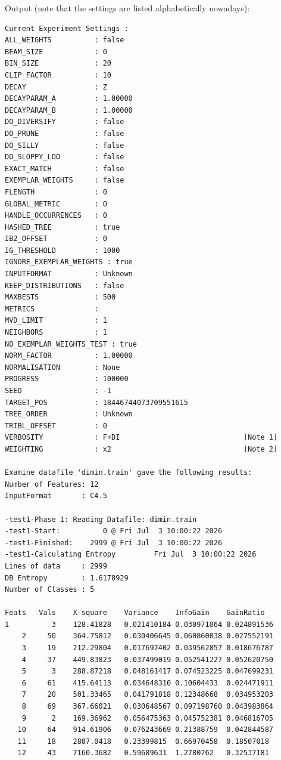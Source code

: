 \documentclass{report}
\begin{document}
Output (note that the settings are listed alphabetically nowadays):
\begin{footnotesize}
\begin{verbatim}
Current Experiment Settings :
ALL_WEIGHTS          : false
BEAM_SIZE            : 0
BIN_SIZE             : 20
CLIP_FACTOR          : 10
DECAY                : Z
DECAYPARAM_A         : 1.00000
DECAYPARAM_B         : 1.00000
DO_DIVERSIFY         : false
DO_PRUNE             : false
DO_SILLY             : false
DO_SLOPPY_LOO        : false
EXACT_MATCH          : false
EXEMPLAR_WEIGHTS     : false
FLENGTH              : 0
GLOBAL_METRIC        : O
HANDLE_OCCURRENCES   : 0
HASHED_TREE          : true
IB2_OFFSET           : 0
IG_THRESHOLD         : 1000
IGNORE_EXEMPLAR_WEIGHTS : true
INPUTFORMAT          : Unknown
KEEP_DISTRIBUTIONS   : false
MAXBESTS             : 500
METRICS              :
MVD_LIMIT            : 1
NEIGHBORS            : 1
NO_EXEMPLAR_WEIGHTS_TEST : true
NORM_FACTOR          : 1.00000
NORMALISATION        : None
PROGRESS             : 100000
SEED                 : -1
TARGET_POS           : 18446744073709551615
TREE_ORDER           : Unknown
TRIBL_OFFSET         : 0
VERBOSITY            : F+DI                             [Note 1]
WEIGHTING            : x2                               [Note 2]

Examine datafile 'dimin.train' gave the following results:
Number of Features: 12
InputFormat       : C4.5

-test1-Phase 1: Reading Datafile: dimin.train
-test1-Start:          0 @ Fri Jul  3 10:00:22 2026
-test1-Finished:    2999 @ Fri Jul  3 10:00:22 2026
-test1-Calculating Entropy         Fri Jul  3 10:00:22 2026
Lines of data     : 2999
DB Entropy        : 1.6178929
Number of Classes : 5

Feats	Vals	X-square	Variance	InfoGain	GainRatio
1          3	128.41828	0.021410184	0.030971064	0.024891536
    2     50	364.75812	0.030406645	0.060860038	0.027552191
    3     19	212.29804	0.017697402	0.039562857	0.018676787
    4     37	449.83823	0.037499019	0.052541227	0.052620750
    5      3	288.87218	0.048161417	0.074523225	0.047699231
    6     61	415.64113	0.034648310	0.10604433	0.024471911
    7     20	501.33465	0.041791818	0.12348668	0.034953203
    8     69	367.66021	0.030648567	0.097198760	0.043983864
    9      2	169.36962	0.056475363	0.045752381	0.046816705
   10     64	914.61906	0.076243669	0.21388759	0.042844587
   11     18	2807.0418	0.23399815	0.66970458	0.18507018
   12     43	7160.3682	0.59689631	1.2780762	0.32537181


\end{verbatim}
\end{footnotesize}
\end{document}
